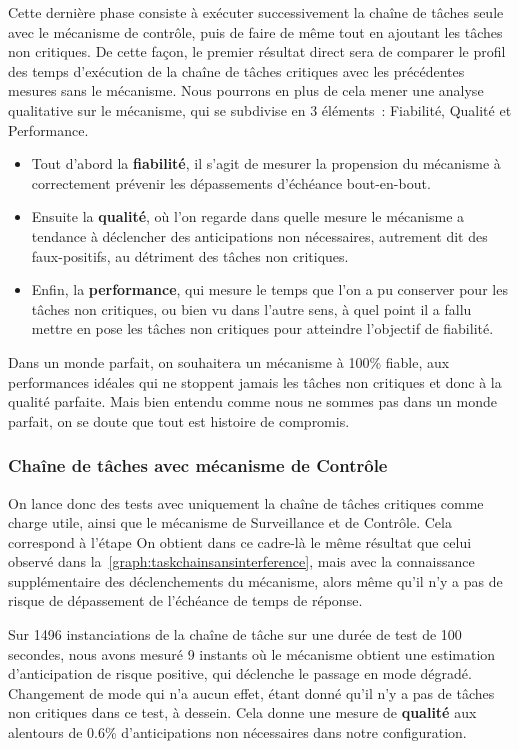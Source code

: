 \documentclass[french, a4paper, 11pt, twoside, pdftex]{StyleThese}
\begin{document}
Cette dernière phase consiste à exécuter successivement la chaîne de tâches seule avec le mécanisme de contrôle, puis de faire de même tout en ajoutant les tâches non critiques. De cette façon, le premier résultat direct sera de comparer le profil des temps d'exécution de la chaîne de tâches critiques avec les précédentes mesures sans le mécanisme. Nous pourrons en plus de cela mener une analyse qualitative sur le mécanisme, qui se subdivise en 3 éléments~: Fiabilité, Qualité et Performance.
\begin{itemize}
	\item Tout d'abord la \textbf{fiabilité}, il s'agit de mesurer la propension du mécanisme à correctement prévenir les dépassements d'échéance bout-en-bout. 
	\item Ensuite la \textbf{qualité}, où l'on regarde dans quelle mesure le mécanisme a tendance à déclencher des anticipations non nécessaires, autrement dit des faux-positifs, au détriment des tâches non critiques. 
	\item Enfin, la \textbf{performance}, qui mesure le temps que l'on a pu conserver pour les tâches non critiques, ou bien vu dans l'autre sens, à quel point il a fallu mettre en pose les tâches non critiques pour atteindre l'objectif de fiabilité. 
\end{itemize}
Dans un monde parfait, on souhaitera un mécanisme à 100\% fiable, aux performances idéales qui ne stoppent jamais les tâches non critiques et donc à la qualité parfaite. Mais bien entendu comme nous ne sommes pas dans un monde parfait, on se doute que tout est histoire de compromis.


\subsubsection{Chaîne de tâches avec mécanisme de Contrôle}

On lance donc des tests avec uniquement la chaîne de tâches critiques comme charge utile, ainsi que le mécanisme de Surveillance et de Contrôle. Cela correspond à l'étape  On obtient dans ce cadre-là le même résultat que celui observé dans la~\autoref{graph:taskchainsansinterference}, mais avec la connaissance supplémentaire des déclenchements du mécanisme, alors même qu'il n'y a pas de risque de dépassement de l'échéance de temps de réponse. 

Sur 1496 instanciations de la chaîne de tâche sur une durée de test de 100 secondes, nous avons mesuré 9 instants où le mécanisme obtient une estimation d'anticipation de risque positive, qui déclenche le passage en mode dégradé. Changement de mode qui n'a aucun effet, étant donné qu'il n'y a pas de tâches non critiques dans ce test, à dessein. Cela donne une mesure de \textbf{qualité} aux alentours de 0.6\% d'anticipations non nécessaires dans notre configuration.
\end{document}
